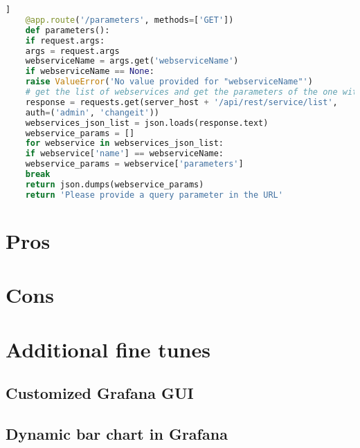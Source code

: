 \begin{minipage}{\linewidth}
	\begin{lstlisting}[language=Python, caption={Get the parameters for a given web service}, label={lst:proxy-params}]]
	@app.route('/parameters', methods=['GET'])
	def parameters():
	if request.args:
	args = request.args
	webserviceName = args.get('webserviceName')
	if webserviceName == None:
	raise ValueError('No value provided for "webserviceName"')
	# get the list of webservices and get the parameters of the one with the name provided in the query
	response = requests.get(server_host + '/api/rest/service/list',
	auth=('admin', 'changeit'))
	webservices_json_list = json.loads(response.text)
	webservice_params = []
	for webservice in webservices_json_list:
	if webservice['name'] == webserviceName:
	webservice_params = webservice['parameters']
	break
	return json.dumps(webservice_params)
	return 'Please provide a query parameter in the URL'
	\end{lstlisting}
\end{minipage}



\section{Pros}

\section{Cons}

\section{Additional fine tunes}

\subsection{Customized Grafana GUI}

\subsection{Dynamic bar chart in Grafana}